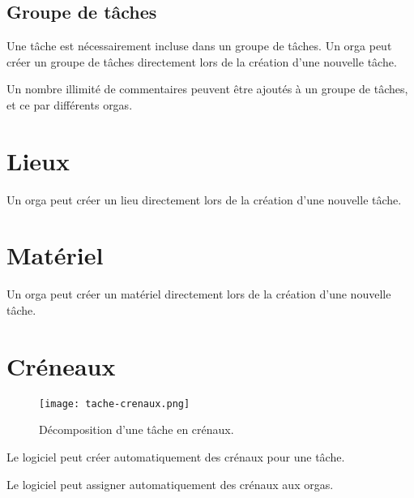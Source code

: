 \subsection{Groupe de tâches}
Une tâche est nécessairement incluse dans un groupe de tâches.
Un orga peut créer un groupe de tâches directement lors de la création d'une nouvelle tâche.

Un nombre illimité de commentaires peuvent être ajoutés à un groupe de tâches, et ce par différents orgas.

\section{Lieux}
Un orga peut créer un lieu directement lors de la création d'une nouvelle tâche.

\section{Matériel}

Un orga peut créer un matériel directement lors de la création d'une nouvelle tâche.


\section{Créneaux}
\begin{figure}[h!t]
\centering
\texttt{[image: tache-crenaux.png]}
\label{fig:ptaches}
\caption{Décomposition d'une tâche en crénaux.}
\end{figure}

Le logiciel peut créer automatiquement des crénaux pour une tâche.

Le logiciel peut assigner automatiquement des crénaux aux orgas.
